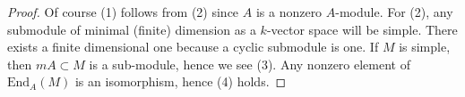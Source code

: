 \documentclass[10pt,a4paper]{amsart}
\theoremstyle{plain}
\theoremstyle{definition}
\theoremstyle{remark}
\numberwithin{equation}{subsection}
\begin{document}
\begin{proof}
Of course (1) follows from (2) since $A$ is a nonzero $A$-module.
For (2), any submodule of minimal (finite) dimension as a $k$-vector
space will be simple. There exists a finite dimensional one
because a cyclic submodule is one. If $M$ is simple, then
$mA \subset M$ is a sub-module, hence we see (3). Any nonzero element
of $\text{End}_A(M)$ is an isomorphism, hence (4) holds.
\end{proof}
\end{document}

